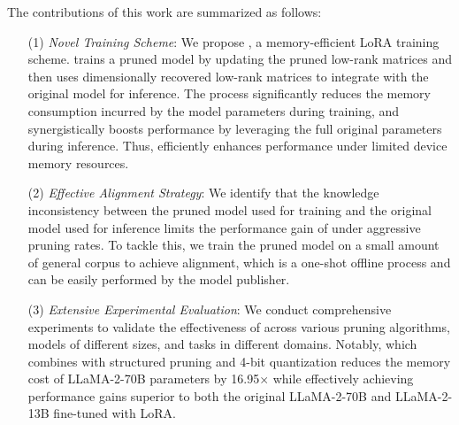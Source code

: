 The contributions of this work are summarized as follows: 

\begin{itemize}[leftmargin=20pt]
\item[(1)]
\textit{Novel Training Scheme}: We propose \method, a memory-efficient LoRA training scheme. \method trains a pruned model by updating the pruned low-rank matrices and then uses dimensionally recovered low-rank matrices to integrate with the original model for inference. The process significantly 
reduces the memory consumption incurred by the model parameters during training,
and synergistically boosts performance by leveraging the full original parameters during inference. Thus, \method efficiently enhances performance under limited device memory resources.

\item[(2)]\textit{Effective Alignment Strategy}: We identify that the knowledge inconsistency between the pruned model used for training and the original model used for inference limits the 
performance gain of \method under aggressive pruning rates. To tackle this, we train the pruned model on a small amount of general corpus 
to achieve alignment, which is a one-shot offline process and can be easily performed by the model publisher.

\item[(3)]\textit{Extensive Experimental Evaluation}: We conduct comprehensive experiments to validate the effectiveness of \method across various pruning algorithms, models of different sizes, and tasks in different domains. Notably, \Qmethod which combines \method with 
structured pruning and 4-bit quantization reduces the memory cost of LLaMA-2-70B parameters by 16.95$\times$ while 
effectively
achieving performance gains superior to both the original LLaMA-2-70B and LLaMA-2-13B fine-tuned with LoRA.
\end{itemize}

